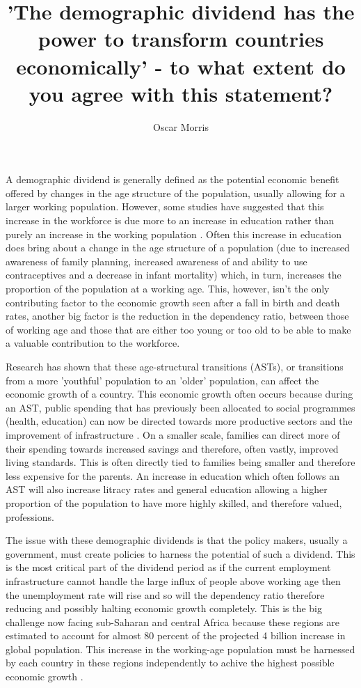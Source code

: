 \documentclass[11pt]{article}
\author{Oscar Morris}
\date{}
\title{'The demographic dividend has the power to transform countries economically' - to what extent do you agree with this statement?}
\begin{document}
\maketitle
A demographic dividend is generally defined as the potential economic benefit offered by changes in the age structure of the population, usually allowing for a larger working population. However, some studies have suggested that this increase in the workforce is due more to an increase in education rather than purely an increase in the working population \cite{lutz2019}. Often this increase in education does bring about a change in the age structure of a population (due to increased awareness of family planning, increased awareness of and ability to use contraceptives and a decrease in infant mortality) which, in turn, increases the proportion of the population at a working age. This, however, isn't the only contributing factor to the economic growth seen after a fall in birth and death rates, another big factor is the reduction in the dependency ratio, between those of working age and those that are either too young or too old to be able to make a valuable contribution to the workforce.

Research has shown that these age-structural transitions (ASTs), or transitions from a more 'youthful' population to an 'older' population, can affect the economic growth of a country. This economic growth often occurs because during an AST, public spending that has previously been allocated to social programmes (health, education) can now be directed towards more productive sectors and the improvement of infrastructure \cite{pool2007}. On a smaller scale, families can direct more of their spending towards increased savings and therefore, often vastly, improved living standards. This is often directly tied to families being smaller and therefore less expensive for the parents. An increase in education which often follows an AST will also increase litracy rates and general education allowing a higher proportion of the population to have more highly skilled, and therefore valued, professions.

The issue with these demographic dividends is that the policy makers, usually a government, must create policies to harness the potential of such a dividend. This is the most critical part of the dividend period as if the current employment infrastructure cannot handle the large influx of people above working age then the unemployment rate will rise and so will the dependency ratio therefore reducing and possibly halting economic growth completely. This is the big challenge now facing sub-Saharan and central Africa because these regions are estimated to account for almost 80 percent of the projected 4 billion increase in global population. This increase in the working-age population must be harnessed by each country in these regions independently to achive the highest possible economic growth \cite{drummond2014}.
\end{document}

